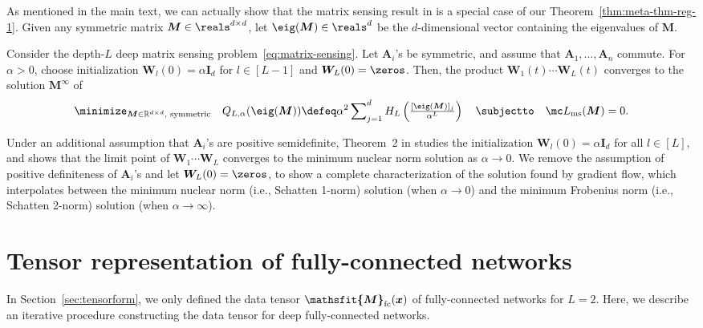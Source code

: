 \documentclass{article} %
\def\vx{{\bm{x}}}
\def\mA{{\bm{A}}}
\def\mI{{\bm{I}}}
\def\mM{{\bm{M}}}
\def\mW{{\bm{W}}}
\newcommand{\tens}[1]{\bm{\mathsfit{#1}}}
\def\tM{{\tens{M}}}
\newcommand{\R}{\mathbb{R}}
\newcommand{\tMfc}{\tM_{\rm fc}}
\begin{document}
As mentioned in the main text, we can actually show that the matrix sensing result in \citet{arora2019implicit} is a special case of our Theorem~\ref{thm:meta-thm-reg-1}.
Given any symmetric matrix $\mM \in \reals^{d \times d}$, let $\eig(\mM) \in \reals^d$ be the $d$-dimensional vector containing the eigenvalues of $\mM$.
\begin{corollary}
\label{cor:reg-matrix-fac}
Consider the depth-$L$ deep matrix sensing problem~\eqref{eq:matrix-sensing}. Let $\mA_i$'s be symmetric, and assume that $\mA_1, \dots, \mA_n$ commute. For $\alpha > 0$, choose initialization $\mW_l(0) = \alpha \mI_d$ for $l \in [L-1]$ and $\mW_L(0) = \zeros$. Then, the product $\mW_1(t)\cdots\mW_L(t)$ converges to the solution $\mM^\infty$ of
\begin{equation*}
    \minimize_{\mM \in \R^{d \times d}, \textup{ symmetric}}\quad Q_{L, \alpha}(\eig(\mM))
    \defeq
    \alpha^2  \sum\nolimits_{j=1}^d H_L \left ( 
    \tfrac{[\eig(\mM)]_j}{\alpha^L}
    \right )
    \quad
    \subjectto
    \quad
    \mc L_{\rm ms}(\mM) = 0.
\end{equation*}
\end{corollary}
Under an additional assumption that $\mA_i$'s are positive semidefinite, Theorem~2 in \citet{arora2019implicit} studies the initialization $\mW_l(0) = \alpha \mI_d$ for all $l \in [L]$, and shows that the limit point of $\mW_1 \cdots \mW_L$ converges to the minimum nuclear norm solution as $\alpha \to 0$. We remove the assumption of positive definiteness of $\mA_i$'s and let $\mW_L(0) = \zeros$, to show a complete characterization of the solution found by gradient flow, which interpolates between the minimum nuclear norm (i.e., Schatten 1-norm) solution (when $\alpha \to 0$) and the minimum Frobenius norm (i.e., Schatten 2-norm) solution (when $\alpha \to \infty$).

\section{Tensor representation of fully-connected networks}
\label{sec:tensorform-ex}
In Section~\ref{sec:tensorform}, we only defined the data tensor $\tMfc(\vx)$ of fully-connected networks for $L=2$. Here, we describe an iterative procedure constructing the data tensor for deep fully-connected networks.
\end{document}

